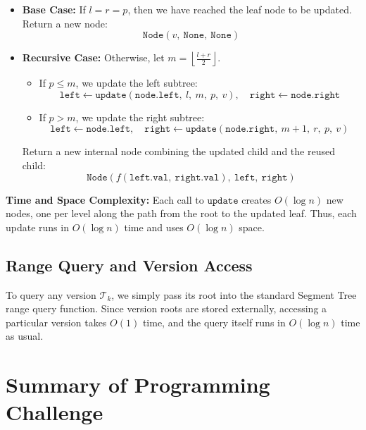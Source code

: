 \documentclass{fairmeta}
\numberwithin{equation}{section}
\begin{document}
\begin{itemize}
    \item \textbf{Base Case:} If $l = r = p$, then we have reached the leaf node to be updated. Return a new node:
          \[
              \texttt{Node}(v,\ \texttt{None},\ \texttt{None})
          \]

    \item \textbf{Recursive Case:} Otherwise, let $m = \left\lfloor \frac{l + r}{2} \right\rfloor$.

          \begin{itemize}
              \item If $p \le m$, we update the left subtree:
                    \[
                        \texttt{left} \gets \texttt{update}(\texttt{node.left},\ l,\ m,\ p,\ v), \quad \texttt{right} \gets \texttt{node.right}
                    \]
              \item If $p > m$, we update the right subtree:
                    \[
                        \texttt{left} \gets \texttt{node.left}, \quad \texttt{right} \gets \texttt{update}(\texttt{node.right},\ m+1,\ r,\ p,\ v)
                    \]
          \end{itemize}

          Return a new internal node combining the updated child and the reused child:
          \[
              \texttt{Node}\left(f(\texttt{left.val},\ \texttt{right.val}),\ \texttt{left},\ \texttt{right}\right)
          \]
\end{itemize}

\vspace{0.5em}
\noindent\textbf{Time and Space Complexity:} Each call to $\texttt{update}$ creates $O(\log n)$ new nodes, one per level along the path from the root to the updated leaf. Thus, each update runs in $O(\log n)$ time and uses $O(\log n)$ space.

\subsection{Range Query and Version Access}

To query any version $\mathcal{T}_k$, we simply pass its root into the standard Segment Tree range query function. Since version roots are stored externally, accessing a particular version takes $O(1)$ time, and the query itself runs in $O(\log n)$ time as usual.

\section{Summary of Programming Challenge}
\end{document}
